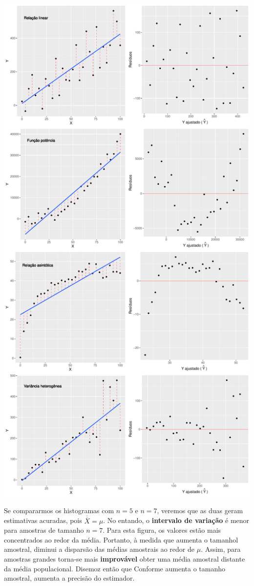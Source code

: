 \documentclass[
]{book}
\begin{document}
\begin{center}\includegraphics{probest-cambientais_files/figure-latex/unnamed-chunk-61-1} \end{center}

Se compararmos os histogramas com \(n = 5\) e \(n = 7\), veremos que as duas geram estimativas acuradas, pois \(\overline{\overline{X}} = \mu\). No entando, o \textbf{intervalo de variação} é menor para amostras de tamanho \(n = 7\). Para esta figura, os valores estão mais concentrados ao redor da média. Portanto, à medida que aumenta o tamanhol amostral, diminui a disparsão das médias amostrais ao redor de \(\mu\). Assim, para amostras grandes torna-se mais \textbf{improvável} obter uma média amostral distante da média populacional. Disemoz então que Conforme aumenta o tamanho amostral, aumenta a precisão do estimador.
\end{document}

